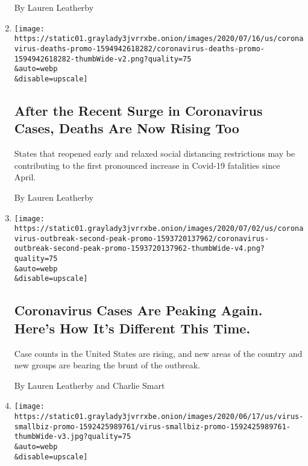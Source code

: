 \begin{enumerate}
  By Lauren Leatherby
\item
  \href{/interactive/2020/07/17/us/coronavirus-deaths.html}{}

  \texttt{[image: https://static01.graylady3jvrrxbe.onion/images/2020/07/16/us/coronavirus-deaths-promo-1594942618282/coronavirus-deaths-promo-1594942618282-thumbWide-v2.png?quality=75\\\&auto=webp\\\&disable=upscale]}

  \hypertarget{after-the-recent-surge-in-coronavirus-cases-deaths-are-now-rising-too}{%
  \subsection{After the Recent Surge in Coronavirus Cases, Deaths Are
  Now Rising
  Too}\label{after-the-recent-surge-in-coronavirus-cases-deaths-are-now-rising-too}}

  States that reopened early and relaxed social distancing restrictions
  may be contributing to the first pronounced increase in Covid-19
  fatalities since April.

  By Lauren Leatherby
\item
  \href{/interactive/2020/07/02/us/coronavirus-cases-increase.html}{}

  \texttt{[image: https://static01.graylady3jvrrxbe.onion/images/2020/07/02/us/coronavirus-outbreak-second-peak-promo-1593720137962/coronavirus-outbreak-second-peak-promo-1593720137962-thumbWide-v4.png?quality=75\\\&auto=webp\\\&disable=upscale]}

  \hypertarget{coronavirus-cases-are-peaking-again-heres-how-its-different-this-time}{%
  \subsection{Coronavirus Cases Are Peaking Again. Here's How It's
  Different This
  Time.}\label{coronavirus-cases-are-peaking-again-heres-how-its-different-this-time}}

  Case counts in the United States are rising, and new areas of the
  country and new groups are bearing the brunt of the outbreak.

  By Lauren Leatherby and Charlie Smart
\item
  \href{/interactive/2020/06/18/us/coronavirus-black-owned-small-business.html}{}

  \texttt{[image: https://static01.graylady3jvrrxbe.onion/images/2020/06/17/us/virus-smallbiz-promo-1592425989761/virus-smallbiz-promo-1592425989761-thumbWide-v3.jpg?quality=75\\\&auto=webp\\\&disable=upscale]}


\end{enumerate}
